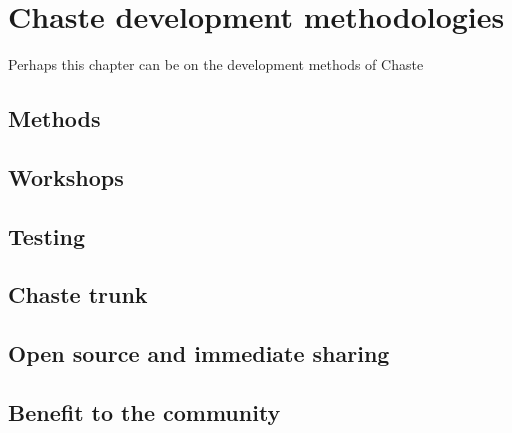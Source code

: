 \chapter{Chaste development methodologies}
Perhaps this chapter can be on the development methods of Chaste
\section{Methods}
\section{Workshops}
\section{Testing}
\section{Chaste trunk}
\section{Open source and immediate sharing}
\section{Benefit to the community}